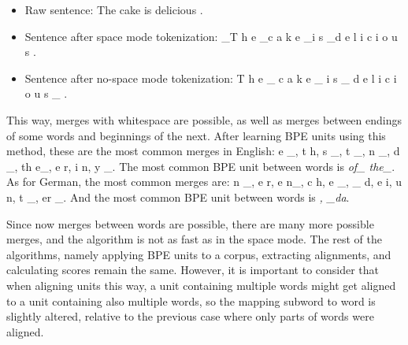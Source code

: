 \begin{itemize}
	\item Raw sentence: The cake is delicious .
	\item Sentence after space mode tokenization: \_T h e \_c a k e \_i s \_d e l i c i o u s .
	\item Sentence after no-space mode tokenization: T h e \_ c a k e \_ i s \_ d e l i c i o u s \_ .
\end{itemize}

This way, merges with whitespace are possible, as well as merges between endings of some words and beginnings of the next. After learning BPE units using this method, these are the most common merges in English: e \_, t h, s \_, t \_, n \_, d \_, th e\_, e r, i n, y \_. The most common BPE unit between words is \emph{of\_ the\_}. As for German, the most common merges are: n \_, e r, e n\_, c h, e \_, \_ d, e i, u n, t \_, er \_. And the most common BPE unit between words is \emph{, \_da}.

Since now merges between words are possible, there are many more possible merges, and the algorithm is not as fast as in the space mode. The rest of the algorithms, namely applying BPE units to a corpus, extracting alignments, and calculating scores remain the same. However, it is important to consider that when aligning units this way, a unit containing multiple words might get aligned to a unit containing also multiple words, so the mapping subword to word is slightly altered, relative to the previous case where only parts of words were aligned.
